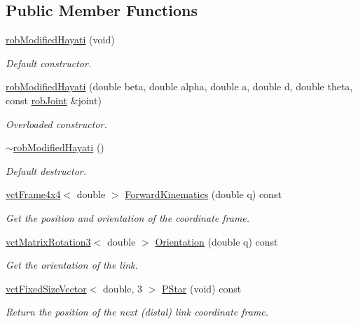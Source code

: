 \subsection*{Public Member Functions}
\begin{DoxyCompactItemize}
\item 
\hyperlink{classrob_modified_hayati_adaa5303b116a4802fbb98723b33ab9ee}{rob\+Modified\+Hayati} (void)
\begin{DoxyCompactList}\small\item\em Default constructor. \end{DoxyCompactList}\item 
\hyperlink{classrob_modified_hayati_a89a13613f31d524f9d44f76329f4165b}{rob\+Modified\+Hayati} (double beta, double alpha, double a, double d, double theta, const \hyperlink{classrob_joint}{rob\+Joint} \&joint)
\begin{DoxyCompactList}\small\item\em Overloaded constructor. \end{DoxyCompactList}\item 
\hyperlink{classrob_modified_hayati_a41630e035ce652db5c2fecbf3091e260}{$\sim$rob\+Modified\+Hayati} ()
\begin{DoxyCompactList}\small\item\em Default destructor. \end{DoxyCompactList}\item 
\hyperlink{classvct_frame4x4}{vct\+Frame4x4}$<$ double $>$ \hyperlink{classrob_modified_hayati_abca1919e45c034490e890649cadbf1da}{Forward\+Kinematics} (double q) const 
\begin{DoxyCompactList}\small\item\em Get the position and orientation of the coordinate frame. \end{DoxyCompactList}\item 
\hyperlink{classvct_matrix_rotation3}{vct\+Matrix\+Rotation3}$<$ double $>$ \hyperlink{classrob_modified_hayati_a53b44af7773748bf087062dec775acb9}{Orientation} (double q) const 
\begin{DoxyCompactList}\small\item\em Get the orientation of the link. \end{DoxyCompactList}\item 
\hyperlink{classvct_fixed_size_vector}{vct\+Fixed\+Size\+Vector}$<$ double, 3 $>$ \hyperlink{classrob_modified_hayati_afb9d219d3eab91f0273d133368480153}{P\+Star} (void) const 
\begin{DoxyCompactList}\small\item\em Return the position of the next (distal) link coordinate frame. \end{DoxyCompactList}\item 

\end{DoxyCompactItemize}
